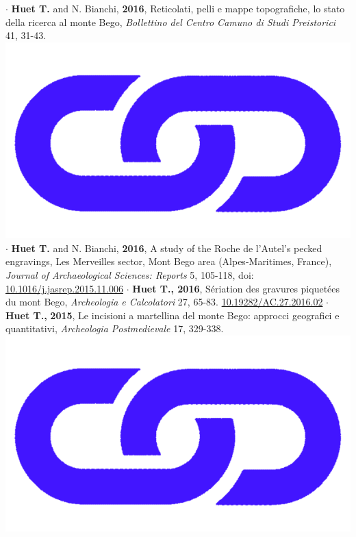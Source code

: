\documentclass{article}
\begin{document}
\smallbreak
$\cdot$ \textbf{Huet T.} and N. Bianchi, \textbf{2016}, Reticolati, pelli e mappe topografiche, lo stato della ricerca al monte Bego, \textit{Bollettino del Centro Camuno di Studi Preistorici} 41, 31-43. \href{http://www.ccsp.it/web/infoccsp/bcsp/bcsp41_preview.pdf}{\includegraphics[scale=0.02]{link_darkblue.png}}
\smallbreak
$\cdot$ \textbf{Huet T.} and N. Bianchi, \textbf{2016}, A study of the Roche de l'Autel's pecked engravings, Les Merveilles sector, Mont Bego area (Alpes-Maritimes, France), \textit{Journal of Archaeological Sciences: Reports} 5, 105-118, doi: \href{https://doi.org/10.1016/j.jasrep.2015.11.006}{10.1016/j.jasrep.2015.11.006}
\smallbreak
$\cdot$ \textbf{Huet T., 2016}, S\'{e}riation des gravures piquet\'{e}es du mont Bego, \textit{Archeologia e Calcolatori} 27, 65-83. \href{https://doi.org/10.19282/AC.27.2016.02}{10.19282/AC.27.2016.02}
\smallbreak
$\cdot$ \textbf{Huet T.,} \textbf{2015}, Le incisioni a martellina del monte Bego: approcci geografici e quantitativi, \textit{Archeologia Postmedievale} 17, 329-338. \href{https://www.insegnadelgiglio.it/wp-content/uploads/2015/01/APM_17_libro-anteprima.pdf}{\includegraphics[scale=0.02]{link_darkblue.png}}
\end{document}

